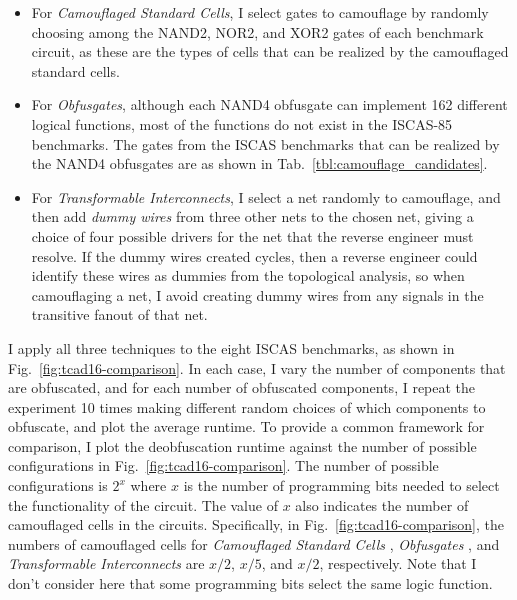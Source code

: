 \documentclass[proposal]{umassthesis}  %
\begin{document}
\begin{itemize}

\item For \textit{Camouflaged Standard Cells}, I select {gates to camouflage by randomly choosing among the } NAND2, NOR2, and XOR2 gates of each benchmark circuit, as these are the types of cells that can be realized by the camouflaged standard cells.

\item For \textit{Obfusgates}, although each NAND4 obfusgate can implement 162 different logical functions, most of the functions do not exist in the ISCAS-85 benchmarks. The gates from the ISCAS benchmarks that can be realized by the NAND4 obfusgates are as shown in Tab.~\ref{tbl:camouflage_candidates}.

\item For \textit{Transformable Interconnects}, I select a net randomly to camouflage, and then add \textit{dummy wires} from three other nets to the chosen net, giving a choice of four possible drivers for the net that the reverse engineer must resolve. If the dummy wires created cycles, then a reverse engineer could identify these wires as dummies from the topological analysis, so when camouflaging a net, I avoid creating dummy wires from any signals in the transitive fanout of that net. 

\end{itemize}



I apply all three techniques to the eight ISCAS benchmarks, as shown in Fig.~\ref{fig:tcad16-comparison}. In each case, I vary the number of components that are obfuscated, and for each number of obfuscated components, I repeat the experiment 10 times making different random choices of which components to obfuscate, and plot the average runtime. To provide a common framework for comparison, I plot the deobfuscation runtime against the number of possible configurations in Fig.~\ref{fig:tcad16-comparison}. The number of possible configurations is $2^x$ where $x$ is the number of programming bits needed to select the functionality of the circuit. {The value of $x$ also indicates the number of camouflaged cells in the circuits. Specifically, in Fig.~\ref{fig:tcad16-comparison}, the numbers of camouflaged cells for \textit{Camouflaged Standard Cells} \cite{rajendran-13}, \textit{Obfusgates} \cite{malik-obfusgate}, and \textit{Transformable Interconnects} \cite{chen-2015-dummyWire} are $x/2$, $x/5$, and $x/2$, respectively}. Note that I don't consider here that some programming bits select the same logic function. 
\end{document}

